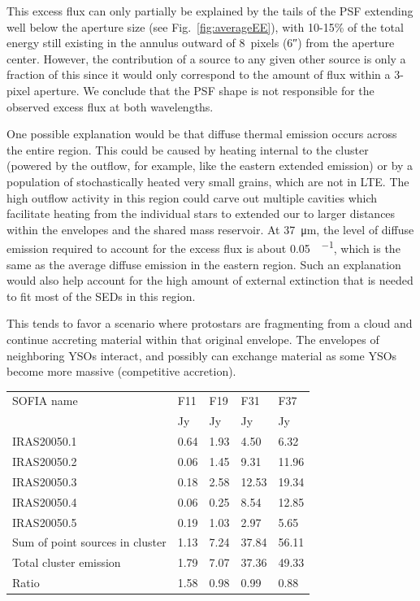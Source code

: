 This excess flux can only partially be explained by the tails of the PSF extending well below the aperture size (see Fig.~\ref{fig:averageEE}), with 10-15\% of the total energy still existing in the annulus outward of 8~pixels (\ang{;;6}) from the aperture center. However, the contribution of a source to any given other source is only a fraction of this since it would only correspond to the amount of flux within a 3-pixel aperture. We conclude that the PSF shape is not responsible for the observed excess flux at both wavelengths.

One possible explanation would be that diffuse thermal emission occurs across the entire region. This could be caused by heating internal to the cluster (powered by the outflow, for example, like the eastern extended emission) or by a population of stochastically heated very small grains, which are not in LTE. The high outflow activity in this region could carve out multiple cavities which facilitate heating from the individual stars to extended our to larger distances within the envelopes and the shared mass reservoir. At \SI{37}{\um}, the level of diffuse emission required to account for the excess flux is about \SI{0.05}{\Jy\per\pixel}, which is the same as the average diffuse emission in the eastern region. Such an explanation would also help account for the high amount of external extinction that is needed to fit most of the SEDs in this region.

This tends to favor a scenario where protostars are fragmenting from a cloud and continue accreting material within that original envelope. The envelopes of neighboring YSOs interact, and possibly can exchange material as some YSOs become more massive (competitive accretion). 

\renewcommand{\arraystretch}{1.5}
\def\labelitemi{--}
\begin{table}[!h]
\scriptsize
\caption[Clustered sources in IRAS~20050+2720's dense core]{Clustered sources in the densest region of IRAS~20050+2720.}
\label{tab:IRAS20050sum}
\vspace{-0.5cm}
\begin{longtable}{lP{2cm}P{2cm}P{2cm}P{2cm}}
\toprule																			
SOFIA name	&	F11	&	F19	&	F31	&	F37	\\
	&	Jy	&	Jy	&	Jy	&	Jy\\
\midrule									
IRAS20050.1	&	0.64	&	1.93	&	4.50	&	6.32	\\
IRAS20050.2	&	0.06	&	1.45	&	9.31	&	11.96	\\
IRAS20050.3	&	0.18	&	2.58	&	12.53	&	19.34	\\
IRAS20050.4	&	0.06	&	0.25	&	8.54	&	12.85	\\
IRAS20050.5	&	0.19	&	1.03	&	2.97	&	5.65	\\
\midrule									
Sum of point sources in cluster	&	1.13	&	7.24	&	37.84	&	56.11	\\
Total cluster emission	&	1.79	&	7.07	&	37.36	&	49.33	\\
Ratio	&	1.58	&	0.98	&	0.99	&	0.88	\\
\bottomrule					
	\end{longtable} 
\end{table}

